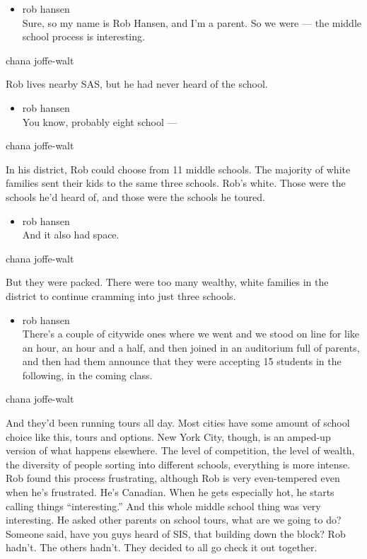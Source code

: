 \begin{itemize}
\tightlist
\item
  rob hansen\\
  Sure, so my name is Rob Hansen, and I'm a parent. So we were --- the
  middle school process is interesting.
\end{itemize}

chana joffe-walt

Rob lives nearby SAS, but he had never heard of the school.

\begin{itemize}
\tightlist
\item
  rob hansen\\
  You know, probably eight school ---
\end{itemize}

chana joffe-walt

In his district, Rob could choose from 11 middle schools. The majority
of white families sent their kids to the same three schools. Rob's
white. Those were the schools he'd heard of, and those were the schools
he toured.

\begin{itemize}
\tightlist
\item
  rob hansen\\
  And it also had space.
\end{itemize}

chana joffe-walt

But they were packed. There were too many wealthy, white families in the
district to continue cramming into just three schools.

\begin{itemize}
\tightlist
\item
  rob hansen\\
  There's a couple of citywide ones where we went and we stood on line
  for like an hour, an hour and a half, and then joined in an auditorium
  full of parents, and then had them announce that they were accepting
  15 students in the following, in the coming class.
\end{itemize}

chana joffe-walt

And they'd been running tours all day. Most cities have some amount of
school choice like this, tours and options. New York City, though, is an
amped-up version of what happens elsewhere. The level of competition,
the level of wealth, the diversity of people sorting into different
schools, everything is more intense. Rob found this process frustrating,
although Rob is very even-tempered even when he's frustrated. He's
Canadian. When he gets especially hot, he starts calling things
``interesting.'' And this whole middle school thing was very
interesting. He asked other parents on school tours, what are we going
to do? Someone said, have you guys heard of SIS, that building down the
block? Rob hadn't. The others hadn't. They decided to all go check it
out together.

